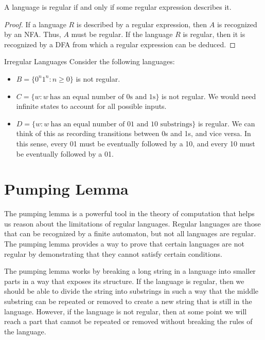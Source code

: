 \documentclass[math]{amznotes}
\begin{document}
\begin{thmbox}{}{}
    A language is regular if and only if some regular expression describes it.
    \tcblower
    \begin{proof}
        If a language $R$ is described by a regular expression, then $A$ is recognized by an NFA. Thus, $A$ must be regular. If the language $R$ is regular, then it is recognized by a DFA from which a regular expression can be deduced.
    \end{proof}
\end{thmbox}

\begin{exbox}{Irregular Languages}{}
    Consider the following languages:
    \begin{itemize}[noitemsep]
        \item $B = \{ 0^n 1^n : n \geq 0\}$ is not regular.
        \item $C = \{ w : w\ \text{has an equal number of 0s and 1s} \}$ is not regular. We would need infinite states to account for all possible inputs.
        \item $D = \{ w : w\ \text{has an equal number of 01 and 10 substrings} \}$ is regular. We can think of this as recording transitions between 0s and 1s, and vice versa. In this sense, every 01 must be eventually followed by a 10, and every 10 must be eventually followed by a 01.
    \end{itemize}
\end{exbox}

\section{Pumping Lemma}
The pumping lemma is a powerful tool in the theory of computation that helps us reason about the limitations of regular languages. Regular languages are those that can be recognized by a finite automaton, but not all languages are regular. The pumping lemma provides a way to prove that certain languages are not regular by demonstrating that they cannot satisfy certain conditions.

The pumping lemma works by breaking a long string in a language into smaller parts in a way that exposes its structure. If the language is regular, then we should be able to divide the string into substrings in such a way that the middle substring can be repeated or removed to create a new string that is still in the language. However, if the language is not regular, then at some point we will reach a part that cannot be repeated or removed without breaking the rules of the language.
\end{document}
